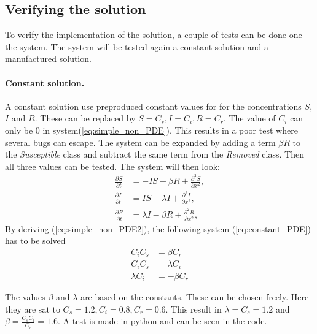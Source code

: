 \documentclass[%
twoside,                 %
final,                   %
10pt]{article}
\begin{document}
\subsection{Verifying the solution}
To verify the implementation of the solution, a couple of tests can be done one the system. The system will be tested again a constant solution and a manufactured solution.   

\paragraph{Constant solution.}
A constant solution use preproduced constant values for for the concentrations $S$, $I$ and $R$. These can be replaced by $S = C_s,I=C_i,R=C_r$. The value of $C_i$ can only be 0 in system(\ref{eq:simple_non_PDE}). This results in a poor test where several bugs can escape. The system can be expanded by adding a term $\beta R$ to the \emph{Susceptible} class and subtract the same term from the \emph{Removed} class. Then all three values can be tested. The system will then look: 
\begin{equation} \label{eq:simple_non_PDE2}
	\begin{aligned}
	\frac{\partial S}{\partial t} &= -IS + \beta R + \frac{\partial^2 S}{\partial x^2},\\
	\frac{\partial I}{\partial t} &= IS- \lambda I + \frac{\partial^2 I}{\partial x^2},\\
	\frac{\partial R}{\partial t} &= \lambda I - \beta R + \frac{\partial^2 R}{\partial x^2},
	\end{aligned}
\end{equation}
By deriving (\ref{eq:simple_non_PDE2}), the following system (\ref{eq:constant_PDE}) has to be solved
\begin{equation} \label{eq:constant_PDE}
	\begin{aligned}
	C_iC_s &= \beta C_r \\
	C_iC_s &= \lambda C_i \\
	\lambda C_i &= -\beta C_r 
	\end{aligned}
\end{equation}

The values $\beta$ and $\lambda$ are based on the constants. These can be chosen freely. Here they are sat to $C_s = 1.2,C_i=0.8,C_r=0.6$. This result in $\lambda= C_s = 1.2$ and $\beta= \frac{C_s C_i}{C_r}=1.6$. A test is made in python and can be seen in the code.
\end{document}
